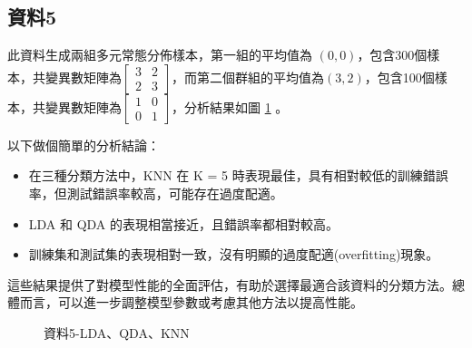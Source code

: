 \subsection{資料5}
此資料生成兩組多元常態分佈樣本，第一組的平均值為 $(0, 0)$，包含300個樣本，共變異數矩陣為$\begin{bmatrix}3 & 2 \\2 & 3 \end{bmatrix}$，而第二個群組的平均值為$(3, 2)$，包含100個樣本，共變異數矩陣為$\begin{bmatrix}1 & 0 \\0 & 1 \end{bmatrix}$，分析結果如圖 \ref{fig:la5-LDAQDAKNN} 。

以下做個簡單的分析結論：
\begin{itemize}
\item 在三種分類方法中，KNN 在 K = 5 時表現最佳，具有相對較低的訓練錯誤率，但測試錯誤率較高，可能存在過度配適。
\item LDA 和 QDA 的表現相當接近，且錯誤率都相對較高。
\item 訓練集和測試集的表現相對一致，沒有明顯的過度配適(overfitting)現象。
\end{itemize}
這些結果提供了對模型性能的全面評估，有助於選擇最適合該資料的分類方法。總體而言，可以進一步調整模型參數或考慮其他方法以提高性能。\\
\begin{table} [h]
\centering
    \caption{資料5之LDA、QDA、KNN錯判率}\label{tb:la5-LDAQDAKNN}
    \renewcommand\arraystretch{1.5}
\end{table}
\begin{figure}[H]
    \caption{資料5-LDA、QDA、KNN}
    \label{fig:la5-LDAQDAKNN}
\end{figure}

